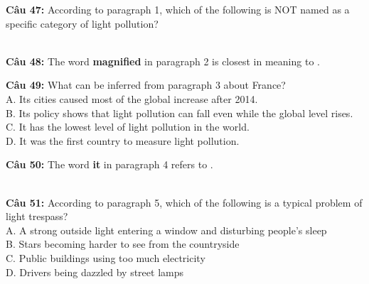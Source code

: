 \documentclass[12pt,a4paper]{article}
\begin{document}



\noindent \textbf{Câu 47:} According to paragraph 1, which of the following is NOT named as a specific category of light pollution?\\
\noindent{}\\
\noindent{}




\noindent \textbf{Câu 48:} The word \textbf{magnified} in paragraph 2 is closest in meaning to \underline{\hspace{1.2cm}}.\\
\noindent{}




\noindent \textbf{Câu 49:} What can be inferred from paragraph 3 about France?\\
\noindent A. Its cities caused most of the global increase after 2014.\\
\noindent B. Its policy shows that light pollution can fall even while the global level rises.\\
\noindent C. It has the lowest level of light pollution in the world.\\
\noindent D. It was the first country to measure light pollution.




\noindent \textbf{Câu 50:} The word \textbf{it} in paragraph 4 refers to \underline{\hspace{1.2cm}}.\\
\noindent{}\\
\noindent{}




\noindent \textbf{Câu 51:} According to paragraph 5, which of the following is a typical problem of light trespass?\\
\noindent A. A strong outside light entering a window and disturbing people's sleep\\
\noindent B. Stars becoming harder to see from the countryside\\
\noindent C. Public buildings using too much electricity\\
\noindent D. Drivers being dazzled by street lamps
\end{document}
